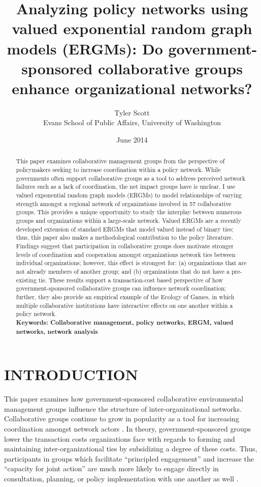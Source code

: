 \documentclass[12pt,a4paper,titlepage]{article}
\title{Analyzing policy networks using valued exponential random graph models (ERGMs): Do government-sponsored collaborative groups enhance organizational networks?}
\author{Tyler Scott\\ Evans School of Public Affairs, University of Washington}
\date{June 2014}
\begin{document}
\singlespacing
\maketitle

\begin{abstract}
\doublespacing

This paper examines collaborative management groups from the perspective of policymakers seeking to increase coordination within a policy network. While governments often support collaborative groups as a tool to address perceived network failures such as a lack of coordination, the net impact groups have is unclear. I use valued exponential random graph models (ERGMs) to model relationships of varying strength amongst a regional network of organizations involved in 57 collaborative groups. This provides a unique opportunity to study the interplay between numerous groups and organizations within a large-scale network. Valued ERGMs are a recently developed extension of standard ERGMs that model valued instead of binary ties; thus, this paper also makes a methodological contribution to the policy literature. Findings suggest that participation in collaborative groups does motivate stronger levels of coordination and cooperation amongst organizations network ties between individual organizations; however, this effect is strongest for: (a) organizations that are not already members of another group; and (b) organizations that do not have a pre-existing tie. These results support a transaction-cost based perspective of how government-sponsored collaborative groups can influence network coordination; further, they also provide an empirical example of the Ecology of Games, in which multiple collaborative institutions have interactive effects on one another within a policy network.\\



\noindent
\bf{Keywords}: Collaborative management, policy networks, ERGM, valued networks, network analysis
\end{abstract}

\doublespacing
\section{\bf\MakeUppercase{Introduction}}

This paper examines how government-sponsored collaborative environmental management groups influence the structure of inter-organizational networks. Collaborative groups continue to grow in popularity as a tool for increasing coordination amongst network actors \parencite{margerum2011}. In theory, government-sponsored groups lower the transaction costs organizations face with regards to forming and maintaining inter-organizational ties by subsidizing a degree of these costs. Thus, participants in groups which facilitate ``principled engagement'' and increase the ``capacity for joint action'' \parencite{emerson2012} are much more likely to engage directly in consultation, planning, or policy implementation with one another as well \parencite{scott2015-a}.
\end{document}
